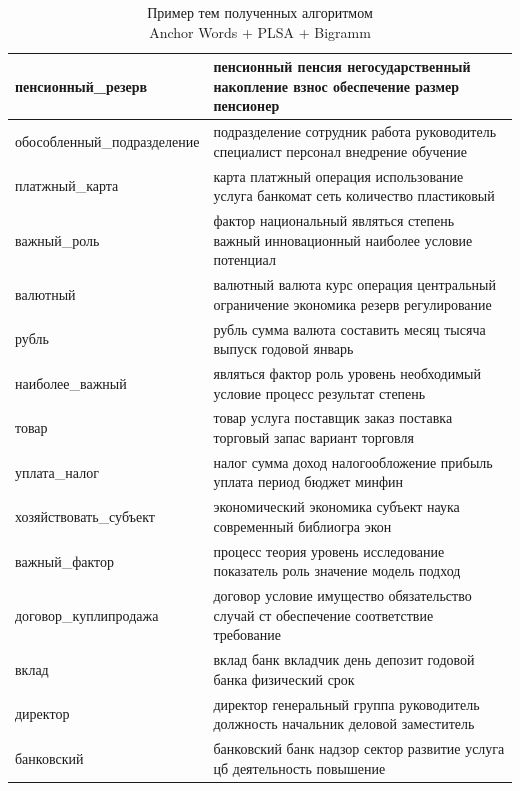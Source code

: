 \documentclass[a4paper, 14pt]{extarticle}
\begin{document}
\begin{landscape}
	\begin{small}
		\begin{singlespace}
			\begin{table}[h]
			\centering
			\caption{Пример тем полученных алгоритмом \\ Anchor Words + PLSA + Bigramm}
			\label{my-label}
				\begin{tabular}{|l|l|}
				\hline
					пенсионный\_резерв &  пенсионный пенсия негосударственный накопление взнос обеспечение размер пенсионер \\ \hline
					обособленный\_подразделение &  подразделение сотрудник работа руководитель специалист персонал внедрение обучение \\ \hline
					платжный\_карта &  карта платжный операция использование услуга банкомат сеть количество пластиковый \\ \hline
					важный\_роль &  фактор национальный являться степень важный инновационный наиболее условие потенциал \\ \hline
					валютный &  валютный валюта курс операция центральный ограничение экономика резерв регулирование \\ \hline
					рубль &  рубль сумма валюта составить месяц тысяча выпуск годовой январь \\ \hline
					наиболее\_важный &  являться фактор роль уровень необходимый условие процесс результат степень \\ \hline
					товар &  товар услуга поставщик заказ поставка торговый запас вариант торговля \\ \hline
					уплата\_налог &  налог сумма доход налогообложение прибыль уплата период бюджет минфин \\ \hline
					хозяйствовать\_субъект &  экономический экономика субъект наука современный библиогра экон \\ \hline
					важный\_фактор &  процесс теория уровень исследование показатель роль значение модель подход \\ \hline
					договор\_куплипродажа &  договор условие имущество обязательство случай ст обеспечение соответствие требование \\ \hline
					вклад &  вклад банк вкладчик день депозит годовой банка физический срок \\ \hline
					директор &  директор генеральный группа руководитель должность начальник деловой заместитель \\ \hline
					банковский &  банковский банк надзор сектор развитие услуга цб деятельность повышение \\ \hline

\end{tabular}
\end{table}
\end{singlespace}
\end{small}
\end{landscape}
\end{document}

